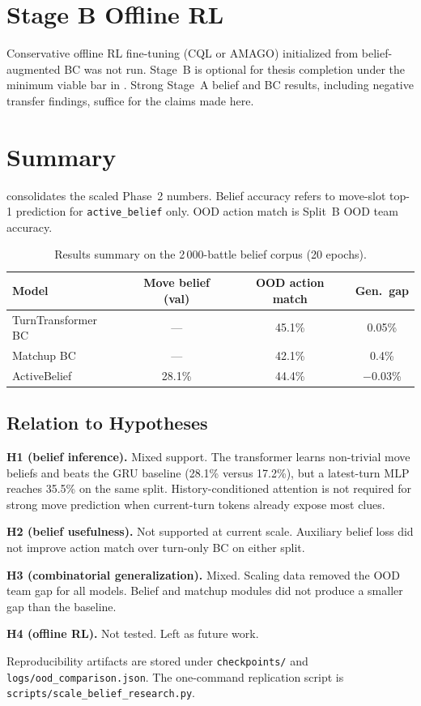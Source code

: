 \section{Stage B Offline RL}

Conservative offline RL fine-tuning (CQL or AMAGO) initialized from belief-
augmented BC was not run. Stage~B is optional for thesis completion under the
minimum viable bar in . Strong Stage~A belief and BC
results, including negative transfer findings, suffice for the claims made here.

\section{Summary}

 consolidates the scaled Phase~2 numbers. Belief
accuracy refers to move-slot top-1 prediction for \texttt{active\_belief} only.
OOD action match is Split~B OOD team accuracy.

\begin{table}[ht]
  \centering
  \caption{Results summary on the 2\,000-battle belief corpus (20 epochs).}
  \label{tab:results-summary}
  \begin{tabular}{lccc}
    \toprule
    Model & Move belief (val) & OOD action match & Gen.\ gap \\
    \midrule
    TurnTransformer BC & --- & 45.1\% & 0.05\% \\
    Matchup BC & --- & 42.1\% & 0.4\% \\
    ActiveBelief & 28.1\% & 44.4\% & $-$0.03\% \\
    \bottomrule
  \end{tabular}
\end{table}

\subsection{Relation to Hypotheses}

\textbf{H1 (belief inference).} Mixed support. The transformer learns non-trivial
move beliefs and beats the GRU baseline (28.1\% versus 17.2\%), but a latest-turn
MLP reaches 35.5\% on the same split. History-conditioned attention is not
required for strong move prediction when current-turn tokens already expose most
clues.

\textbf{H2 (belief usefulness).} Not supported at current scale. Auxiliary
belief loss did not improve action match over turn-only BC on either split.

\textbf{H3 (combinatorial generalization).} Mixed. Scaling data removed the OOD
team gap for all models. Belief and matchup modules did not produce a smaller
gap than the baseline.

\textbf{H4 (offline RL).} Not tested. Left as future work.

Reproducibility artifacts are stored under \texttt{checkpoints/} and
\texttt{logs/ood\_comparison.json}. The one-command replication script is
\texttt{scripts/scale\_belief\_research.py}.
